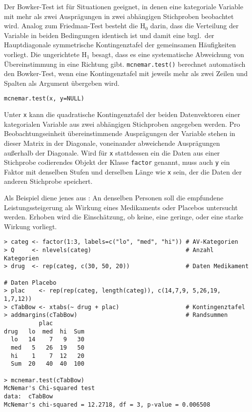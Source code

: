 Der Bowker-Test ist für Situationen geeignet, in denen eine kategoriale Variable mit mehr als zwei Ausprägungen in zwei abhängigen Stichproben beobachtet wird. Analog zum Friedman-Test besteht die $\text{H}_{0}$ darin, dass die Verteilung der Variable in beiden Bedingungen identisch ist und damit eine bzgl.\ der Hauptdiagonale symmetrische Kontingenztafel der gemeinsamen Häufigkeiten vorliegt. Die ungerichtete $\text{H}_{1}$ besagt, dass es eine systematische Abweichung von Übereinstimmung in eine Richtung gibt.  \lstinline!mcnemar.test()! berechnet automatisch den Bowker-Test, wenn eine Kontingenztafel mit jeweils mehr als zwei Zeilen und Spalten als Argument übergeben wird.
\begin{lstlisting}
mcnemar.test(x, y=NULL)
\end{lstlisting}

Unter \lstinline!x! kann die quadratische Kontingenztafel der beiden Datenvektoren einer kategorialen Variable aus zwei abhängigen Stichproben angegeben werden. Pro Beobachtungseinheit übereinstimmende Ausprägungen der Variable stehen in dieser Matrix in der Diagonale, voneinander abweichende Ausprägungen außerhalb der Diagonale. Wird für \lstinline!x! stattdessen ein die Daten aus einer Stichprobe codierendes Objekt der Klasse \lstinline!factor! genannt, muss auch \lstinline!y! ein Faktor mit denselben Stufen und derselben Länge wie \lstinline!x! sein, der die Daten der anderen Stichprobe speichert.

Als Beispiel diene jenes aus : An denselben Personen soll die empfundene Leistungssteigerung als Wirkung eines Medikaments oder Placebos untersucht werden. Erhoben wird die Einschätzung, ob keine, eine geringe, oder eine starke Wirkung vorliegt.
\begin{lstlisting}
> categ <- factor(1:3, labels=c("lo", "med", "hi")) # AV-Kategorien
> Q     <- nlevels(categ)                           # Anzahl Kategorien
> drug  <- rep(categ, c(30, 50, 20))                # Daten Medikament

# Daten Placebo
> plac    <- rep(rep(categ, length(categ)), c(14,7,9, 5,26,19, 1,7,12))
> cTabBow <- xtabs(~ drug + plac)                   # Kontingenztafel
> addmargins(cTabBow)                               # Randsummen
          plac
drug   lo  med  hi  Sum
  lo   14    7   9   30
  med   5   26  19   50
  hi    1    7  12   20
  Sum  20   40  40  100

> mcnemar.test(cTabBow)
McNemar's Chi-squared test
data:  cTabBow
McNemar's chi-squared = 12.2718, df = 3, p-value = 0.006508
\end{lstlisting}

